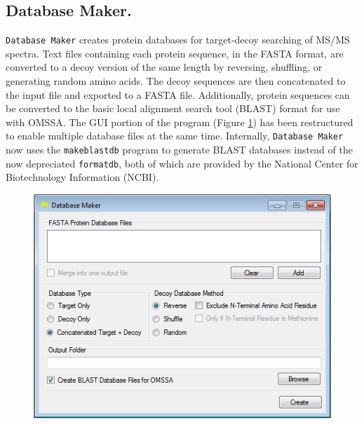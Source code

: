 \subsection*{Database Maker.}
\texttt{Database Maker} creates protein databases for target-decoy searching of MS/MS spectra. Text files containing each protein sequence, in the FASTA format, are converted to a decoy version of the same length by reversing, shuffling, or generating random amino acids.\cite{targetdecoy,targetdecoycomp,qscore} The decoy sequences are then concatenated to the input file and exported to a FASTA file. Additionally, protein sequences can be converted to the basic local alignment search tool (BLAST) format for use with OMSSA.\cite{blast} The GUI portion of the program (Figure \ref{fig:databasemaker}) has been restructured to enable multiple database files at the same time. Internally, \texttt{Database Maker} now uses the \texttt{makeblastdb} program to generate BLAST databases instead of the now depreciated \texttt{formatdb}, both of which are provided by the National Center for Biotechnology Information (NCBI).
\begin{figure}[p]
	\centering
	\includegraphics[width=\columnwidth]{csmsl/databasemaker.png}
	\label{fig:databasemaker}
\end{figure}


